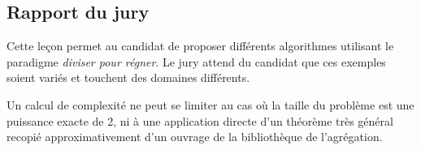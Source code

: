\documentclass[../../Agregation.tex]{subfiles}
\begin{document}

\subsection{Rapport du jury}

\begin{aquote}{}
Cette leçon permet au candidat de proposer différents algorithmes utilisant le paradigme \emph{diviser pour régner}. Le jury attend du candidat que ces exemples soient variés et touchent des domaines différents.

Un calcul de complexité ne peut se limiter au cas où la taille du problème est une puissance exacte de 2, ni à une application directe d'un théorème très général recopié approximativement d'un ouvrage de la bibliothèque de l'agrégation.
\end{aquote}
\end{document}
